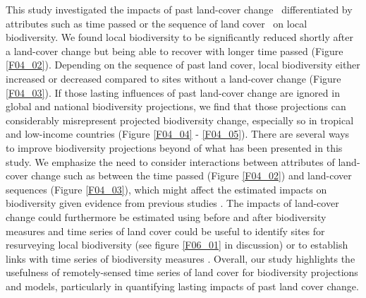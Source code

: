 This study investigated the impacts of past land-cover change \textendash\ differentiated by attributes such as time passed or the sequence of land cover \textendash\ on local biodiversity. We found local biodiversity to be significantly reduced shortly after a land-cover change but being able to recover with longer time passed (Figure \ref{F04_02}). Depending on the sequence of past land cover, local biodiversity either increased or decreased compared to sites without a land-cover change (Figure \ref{F04_03}). If those lasting influences of past land-cover change are ignored in global and national biodiversity projections, we find that those projections can considerably misrepresent projected biodiversity change, especially so in tropical and low-income countries (Figure \ref{F04_04} - \ref{F04_05}). There are several ways to improve biodiversity projections beyond of what has been presented in this study. We emphasize the need to consider interactions between attributes of land-cover change such as between the time passed (Figure \ref{F04_02}) and land-cover sequences (Figure \ref{F04_03}), which might affect the estimated impacts on biodiversity given evidence from previous studies \citep{Chazdon2003,Martin2013}. The impacts of land-cover change could furthermore be estimated using before and after biodiversity measures \citep{DePalma2018} and time series of land cover could be useful to identify sites for resurveying local biodiversity (see figure \ref{F06_01} in discussion) or to establish links with time series of biodiversity measures \citep{Dornelas2018}. Overall, our study highlights the usefulness of remotely-sensed time series of land cover for biodiversity projections and models, particularly in quantifying lasting impacts of past land cover change.

\clearpage
%

%  
